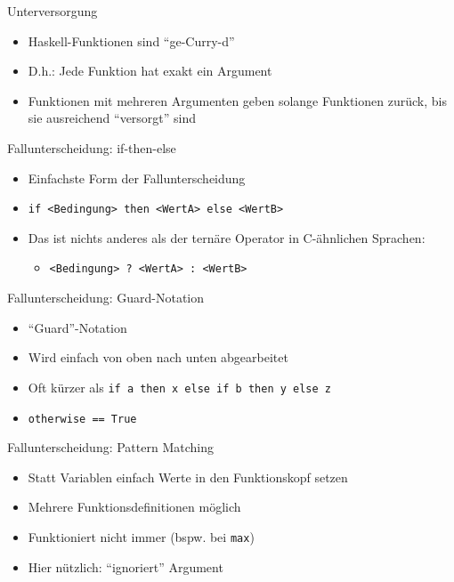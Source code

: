 \documentclass{beamer}
\begin{document}
\begin{frame}{Unterversorgung}
	\begin{itemize}
		\item Haskell-Funktionen sind \enquote{ge-Curry-d}
		\item D.h.: Jede Funktion hat exakt ein Argument
		\item Funktionen mit mehreren Argumenten geben solange Funktionen zurück, bis sie ausreichend \enquote{versorgt} sind
	\end{itemize}

\end{frame}

\begin{frame}{Fallunterscheidung: if-then-else}

	\begin{itemize}
		\item Einfachste Form der Fallunterscheidung
		\item \texttt{if <Bedingung> then <WertA> else <WertB>}
		\pause
		\item Das ist nichts anderes als der ternäre Operator in C-ähnlichen Sprachen:
		\begin{itemize}
			\item \texttt{<Bedingung> ? <WertA> : <WertB>}
		\end{itemize}
	\end{itemize}
\end{frame}

\begin{frame}{Fallunterscheidung: Guard-Notation}

	\begin{itemize}
		\item \enquote{Guard}-Notation
		\item Wird einfach von oben nach unten abgearbeitet
		\item Oft kürzer als \texttt{if a then x else if b then y else z}
		\pause
		\item \texttt{otherwise == True}
	\end{itemize}
\end{frame}

\begin{frame}{Fallunterscheidung: Pattern Matching}

	\begin{itemize}
		\item Statt Variablen einfach Werte in den Funktionskopf setzen
		\item Mehrere Funktionsdefinitionen möglich
		\item Funktioniert nicht immer (bspw. bei \texttt{max})
                \item Hier nützlich: \texttt{\textunderscore} \enquote{ignoriert} Argument
	\end{itemize}
\end{frame}
\end{document}
